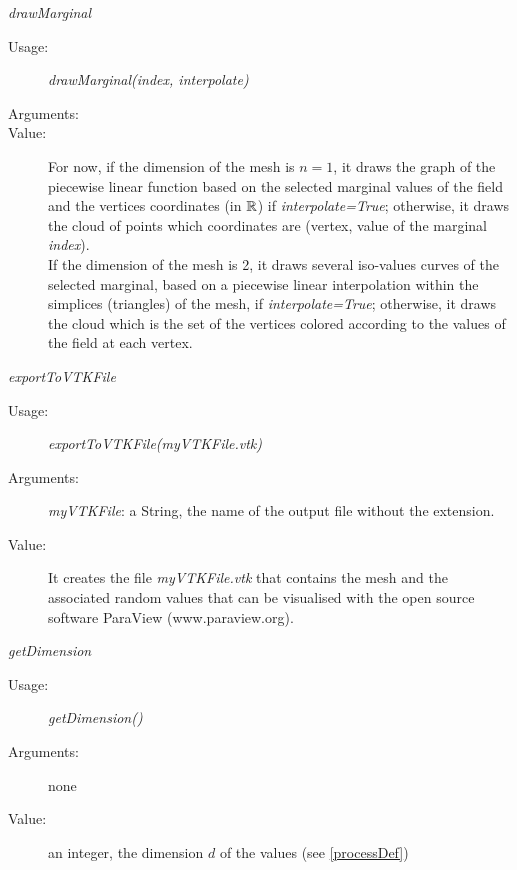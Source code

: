 \begin{description}
\begin{description}
\item \textit{drawMarginal}
\begin{description}
\item[Usage:] \textit{drawMarginal(index, interpolate)}
\item[Arguments:] \rule{0pt}{1em}
\item[Value:] For now, if the dimension of the mesh is $n=1$, it draws the graph of the piecewise linear function based on the selected marginal values of the field and the vertices coordinates (in ${\mathbb R}$) if \textit{interpolate=True}; otherwise, it draws the cloud of points which coordinates are (vertex, value of the marginal \textit{index}).\\
If the dimension of the mesh is 2, it draws several iso-values curves of the selected marginal, based on a piecewise linear interpolation within the simplices (triangles) of the mesh, if \textit{interpolate=True}; otherwise, it draws the cloud which is the set of the vertices colored according to the values of the field at each vertex.
\end{description}
\bigskip

\item \textit{exportToVTKFile}
\begin{description}
\item[Usage:] \textit{exportToVTKFile(myVTKFile.vtk)}
\item[Arguments:] \textit{myVTKFile}: a String, the name of the output file without the extension.
\item[Value:] It creates the file \textit{myVTKFile.vtk} that contains the mesh and the associated random values that can be visualised with  the open source software ParaView (www.paraview.org).
\end{description}
\bigskip

\item \textit{getDimension}
\begin{description}
\item[Usage:] \textit{getDimension()}
\item[Arguments:] none
\item[Value:] an integer, the dimension $d$ of the values (see \ref{processDef})
\end{description}
\bigskip


\end{description}
\end{description}
